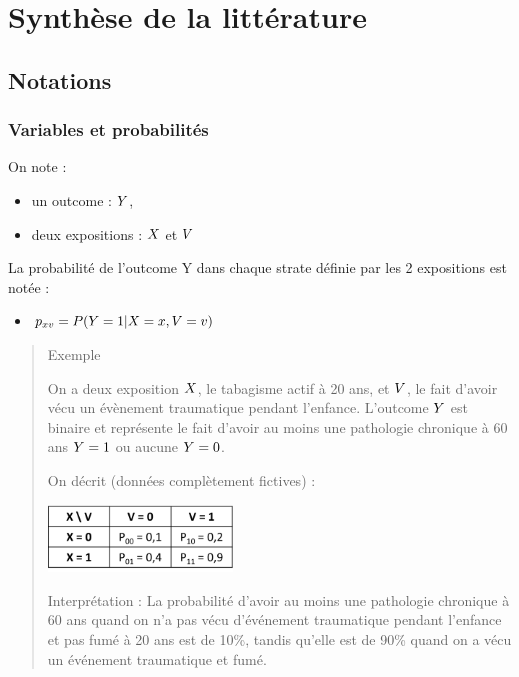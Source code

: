 \documentclass[
]{book}
\providecommand{\tightlist}{%
  \setlength{\itemsep}{0pt}\setlength{\parskip}{0pt}}
\begin{document}
\hypertarget{part-synthuxe8se-de-la-littuxe9rature}{%
\part{Synthèse de la littérature}\label{part-synthuxe8se-de-la-littuxe9rature}}

\hypertarget{notations}{%
\chapter{Notations}\label{notations}}

\hypertarget{variables-et-probabilituxe9s}{%
\section{Variables et probabilités}\label{variables-et-probabilituxe9s}}

On note :

\begin{itemize}
\tightlist
\item
  un outcome : \(\small Y\),
\item
  deux expositions : \(\small X\) et \(\small V\)
\end{itemize}

La probabilité de l'outcome Y dans chaque strate définie par les 2 expositions est notée :

\begin{itemize}
\tightlist
\item
  \(\small p_{xv} = P(Y = 1|X = x,V = v)\)
\end{itemize}

\begin{quote}
Exemple

On a deux exposition \(\small X\), le tabagisme actif à 20 ans, et \(\small V\), le fait d'avoir vécu un évènement traumatique pendant l'enfance. L'outcome \(\small Y\) est binaire et représente le fait d'avoir au moins une pathologie chronique à 60 ans \(\small Y=1\) ou aucune \(\small Y=0\).

On décrit (données complètement fictives) :

\includegraphics[width=0.4\textwidth,height=\textheight]{img/Image1.png}

Interprétation : La probabilité d'avoir au moins une pathologie chronique à 60 ans quand on n'a pas vécu d'événement traumatique pendant l'enfance et pas fumé à 20 ans est de 10\%, tandis qu'elle est de 90\% quand on a vécu un événement traumatique et fumé.
\end{quote}
\end{document}
